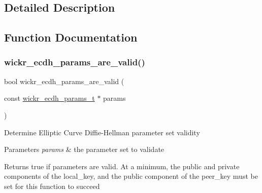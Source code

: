 \subsection{Detailed Description}


\subsection{Function Documentation}
\mbox{\label{group__wickr__ecdh__params_ga801f1bfae11ac0c94d59bf9dd58f78aa}} 
\subsubsection{\texorpdfstring{wickr\+\_\+ecdh\+\_\+params\+\_\+are\+\_\+valid()}{wickr\_ecdh\_params\_are\_valid()}}
{\footnotesize\ttfamily bool wickr\+\_\+ecdh\+\_\+params\+\_\+are\+\_\+valid (\begin{DoxyParamCaption}\item[{const \hyperlink{structwickr__ecdh__params}{wickr\+\_\+ecdh\+\_\+params\+\_\+t} $\ast$}]{params }\end{DoxyParamCaption})}

Determine Elliptic Curve Diffie-\/\+Hellman parameter set validity


\begin{DoxyParams}{Parameters}
{\em params} & the parameter set to validate \\
\hline
\end{DoxyParams}
\begin{DoxyReturn}{Returns}
true if parameters are valid. At a minimum, the public and private components of the \textquotesingle{}local\+\_\+key\textquotesingle{}, and the public component of the \textquotesingle{}peer\+\_\+key\textquotesingle{} must be set for this function to succeed 
\end{DoxyReturn}
\mbox{\label{group__wickr__ecdh__params_ga016f2b643f2636c05ed72bc08a0314f0}} 
